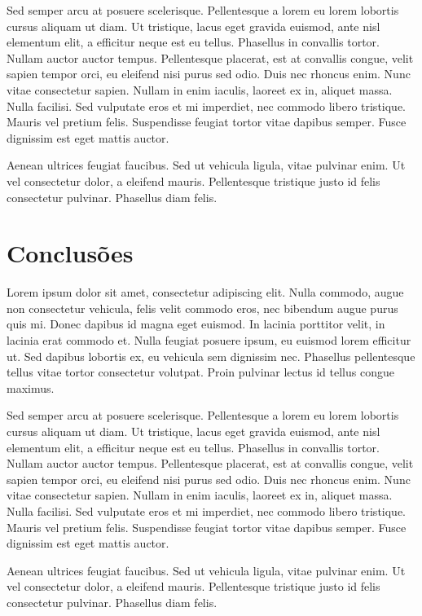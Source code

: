\documentclass[brazil,hardcopy,openany,a5paper]{ufscthesis}
\begin{document}
Sed semper arcu at posuere scelerisque. Pellentesque a lorem eu lorem lobortis cursus aliquam ut diam. Ut tristique, lacus eget gravida euismod, ante nisl elementum elit, a efficitur neque est eu tellus. Phasellus in convallis tortor. Nullam auctor auctor tempus. Pellentesque placerat, est at convallis congue, velit sapien tempor orci, eu eleifend nisi purus sed odio. Duis nec rhoncus enim. Nunc vitae consectetur sapien. Nullam in enim iaculis, laoreet ex in, aliquet massa. Nulla facilisi. Sed vulputate eros et mi imperdiet, nec commodo libero tristique. Mauris vel pretium felis. Suspendisse feugiat tortor vitae dapibus semper. Fusce dignissim est eget mattis auctor.

Aenean ultrices feugiat faucibus. Sed ut vehicula ligula, vitae pulvinar enim. Ut vel consectetur dolor, a eleifend mauris. Pellentesque tristique justo id felis consectetur pulvinar. Phasellus diam felis.

\chapter{Conclusões}
\label{chapter:conclusoes}
	
Lorem ipsum dolor sit amet, consectetur adipiscing elit. Nulla commodo, augue non consectetur vehicula, felis velit commodo eros, nec bibendum augue purus quis mi. Donec dapibus id magna eget euismod. In lacinia porttitor velit, in lacinia erat commodo et. Nulla feugiat posuere ipsum, eu euismod lorem efficitur ut. Sed dapibus lobortis ex, eu vehicula sem dignissim nec. Phasellus pellentesque tellus vitae tortor consectetur volutpat. Proin pulvinar lectus id tellus congue maximus.

Sed semper arcu at posuere scelerisque. Pellentesque a lorem eu lorem lobortis cursus aliquam ut diam. Ut tristique, lacus eget gravida euismod, ante nisl elementum elit, a efficitur neque est eu tellus. Phasellus in convallis tortor. Nullam auctor auctor tempus. Pellentesque placerat, est at convallis congue, velit sapien tempor orci, eu eleifend nisi purus sed odio. Duis nec rhoncus enim. Nunc vitae consectetur sapien. Nullam in enim iaculis, laoreet ex in, aliquet massa. Nulla facilisi. Sed vulputate eros et mi imperdiet, nec commodo libero tristique. Mauris vel pretium felis. Suspendisse feugiat tortor vitae dapibus semper. Fusce dignissim est eget mattis auctor.

Aenean ultrices feugiat faucibus. Sed ut vehicula ligula, vitae pulvinar enim. Ut vel consectetur dolor, a eleifend mauris. Pellentesque tristique justo id felis consectetur pulvinar. Phasellus diam felis.
\end{document}
